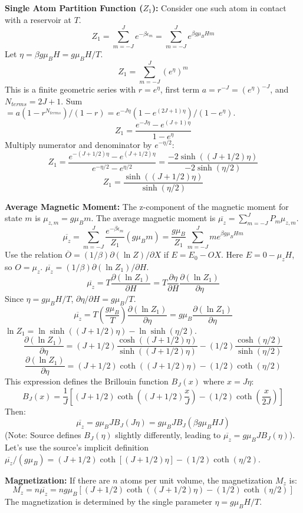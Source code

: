 \documentclass[11pt]{article}
\newcommand{\avg}[1]{\overline{#1}}
\newcommand{\pderiv}[2]{\frac{\partial #1}{\partial #2}}
\newcommand{\muB}{\mu_B} %
\begin{document}
\textbf{Single Atom Partition Function ($Z_1$):}
Consider one such atom in contact with a reservoir at $T$.
\[ Z_1 = \sum_{m=-J}^{J} e^{-\beta \epsilon_m} = \sum_{m=-J}^{J} e^{\beta g \muB H m} \]
Let $\eta = \beta g \muB H = g \muB H / T$.
\[ Z_1 = \sum_{m=-J}^{J} (e^\eta)^m \]
This is a finite geometric series with $r=e^\eta$, first term $a=r^{-J}=(e^\eta)^{-J}$, and $N_{terms}=2J+1$.
Sum $= a (1-r^{N_{terms}}) / (1-r) = e^{-J\eta} (1 - e^{(2J+1)\eta}) / (1-e^\eta)$.
\[ Z_1 = \frac{e^{-J\eta} - e^{(J+1)\eta}}{1 - e^\eta} \]
Multiply numerator and denominator by $e^{-\eta/2}$:
\[ Z_1 = \frac{e^{-(J+1/2)\eta} - e^{(J+1/2)\eta}}{e^{-\eta/2} - e^{\eta/2}} = \frac{-2 \sinh((J+1/2)\eta)}{-2 \sinh(\eta/2)} \]
\[ Z_1 = \frac{\sinh((J+1/2)\eta)}{\sinh(\eta/2)} \]

\textbf{Average Magnetic Moment:}
The z-component of the magnetic moment for state $m$ is $\mu_{z,m} = g \muB m$.
The average magnetic moment is $\avg{\mu_z} = \sum_{m=-J}^J P_m \mu_{z,m}$.
\[ \avg{\mu_z} = \sum_{m=-J}^J \frac{e^{-\beta \epsilon_m}}{Z_1} (g \muB m) = \frac{g \muB}{Z_1} \sum_{m=-J}^J m e^{\beta g \muB H m} \]
Use the relation $\avg{O} = (1/\beta) \partial(\ln Z)/\partial X$ if $E = E_0 - O X$. Here $E = 0 - \mu_z H$, so $O = \mu_z$.
$\avg{\mu_z} = (1/\beta) \partial(\ln Z_1)/\partial H$.
\[ \avg{\mu_z} = T \pderiv{(\ln Z_1)}{H} = T \pderiv{\eta}{H} \pderiv{(\ln Z_1)}{\eta} \]
Since $\eta = g\muB H / T$, $\partial \eta / \partial H = g \muB / T$.
\[ \avg{\mu_z} = T \left( \frac{g \muB}{T} \right) \pderiv{(\ln Z_1)}{\eta} = g \muB \pderiv{(\ln Z_1)}{\eta} \]
$\ln Z_1 = \ln \sinh((J+1/2)\eta) - \ln \sinh(\eta/2)$.
\[ \pderiv{(\ln Z_1)}{\eta} = (J+1/2) \frac{\cosh((J+1/2)\eta)}{\sinh((J+1/2)\eta)} - (1/2) \frac{\cosh(\eta/2)}{\sinh(\eta/2)} \]
\[ \pderiv{(\ln Z_1)}{\eta} = (J+1/2) \coth((J+1/2)\eta) - (1/2) \coth(\eta/2) \]
This expression defines the Brillouin function $B_J(x)$ where $x=J\eta$:
\[ B_J(x) = \frac{1}{J} \left[ (J+1/2) \coth((J+1/2)\frac{x}{J}) - (1/2) \coth(\frac{x}{2J}) \right] \]
Then:
\[ \avg{\mu_z} = g \muB J B_J(J\eta) = g \muB J B_J( \beta g \muB H J ) \]
(Note: Source defines $B_J(\eta)$ slightly differently, leading to $\avg{\mu_z}=g\muB J B_J(\eta)$). Let's use the source's implicit definition $\overline{\mu_z}/(g\mu_B) = (J+1/2) \coth[(J+1/2)\eta] - (1/2)\coth(\eta/2)$.

\textbf{Magnetization:}
If there are $n$ atoms per unit volume, the magnetization $M_z$ is:
\[ M_z = n \avg{\mu_z} = n g \muB \left[ (J+1/2) \coth((J+1/2)\eta) - (1/2) \coth(\eta/2) \right] \]
The magnetization is determined by the single parameter $\eta = g\muB H / T$.
\end{document}
